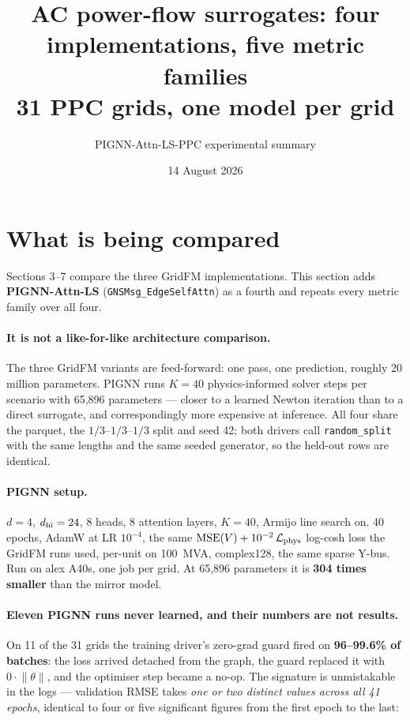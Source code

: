 \documentclass[10pt]{article}
\title{AC power-flow surrogates: four implementations, five metric families\\
\large 31 PPC grids, one model per grid}
\author{PIGNN-Attn-LS-PPC experimental summary}
\date{14 August 2026}
\begin{document}
\maketitle

\section{What is being compared}

Sections 3--7 compare the three GridFM implementations. This section adds
\textbf{PIGNN-Attn-LS} (\texttt{GNSMsg\_EdgeSelfAttn}) as a fourth and repeats
every metric family over all four.

\paragraph{It is not a like-for-like architecture comparison.} The three GridFM
variants are feed-forward: one pass, one prediction, roughly 20 million
parameters. PIGNN runs $K=40$ physics-informed solver steps per scenario with
65{,}896 parameters --- closer to a learned Newton iteration than to a direct
surrogate, and correspondingly more expensive at inference. All four share the
parquet, the $1/3$--$1/3$--$1/3$ split and seed 42; both drivers call
\texttt{random\_split} with the same lengths and the same seeded generator, so
the held-out rows are identical.

\paragraph{PIGNN setup.} $d=4$, $d_{\rm hi}=24$, 8 heads, 8 attention layers,
$K=40$, Armijo line search on. 40 epochs, AdamW at LR $10^{-4}$, the same
$\mathrm{MSE}(V) + 10^{-2}\,\mathcal{L}_{\rm phys}$ log-cosh loss the GridFM runs
used, per-unit on 100~MVA, complex128, the same sparse Y-bus. Run on alex A40s,
one job per grid. At 65{,}896 parameters it is \textbf{304 times smaller} than
the mirror model.

\paragraph{\textbf{Eleven PIGNN runs never learned, and their numbers are not
results.}} On 11 of the 31 grids the training driver's zero-grad guard fired on
\textbf{96--99.6\% of batches}: the loss arrived detached from the graph, the
guard replaced it with $0 \cdot \lVert\theta\rVert$, and the optimiser step
became a no-op. The signature is unmistakable in the logs --- validation RMSE
takes \emph{one or two distinct values across all 41 epochs}, identical to four or five
significant figures from the first epoch to the last:
\end{document}
